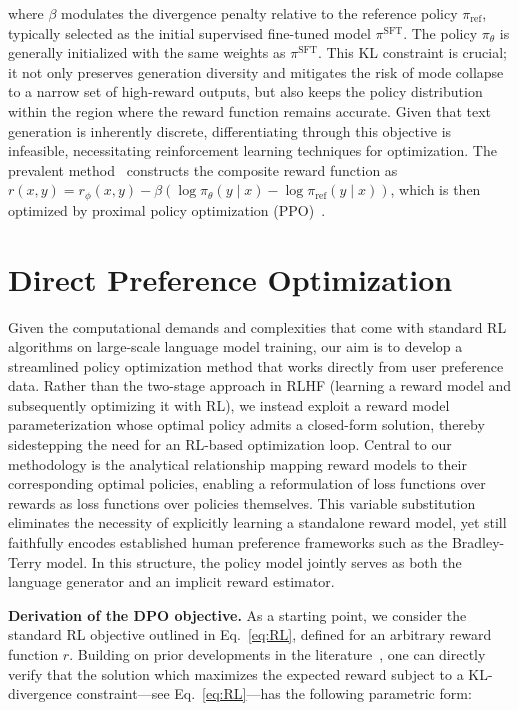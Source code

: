 where $\beta$ modulates the divergence penalty relative to the reference policy $\pi_\text{ref}$, typically selected as the initial supervised fine-tuned model $\pi^\text{SFT}$. The policy $\pi_\theta$ is generally initialized with the same weights as $\pi^\text{SFT}$. This KL constraint is crucial; it not only preserves generation diversity and mitigates the risk of mode collapse to a narrow set of high-reward outputs, but also keeps the policy distribution within the region where the reward function remains accurate. Given that text generation is inherently discrete, differentiating through this objective is infeasible, necessitating reinforcement learning techniques for optimization. The prevalent method~\citep{ziegler2020finetuning, stiennon2022learning, bai2022training, ouyang2022training} constructs the composite reward function as ${r(x, y) = r_{\phi}(x, y) -\beta (\log \pi_{\theta}(y\mid x) - \log \pi_\text{ref}(y\mid x))}$, which is then optimized by proximal policy optimization (PPO)~\cite{schulman2017proximal}. 

\section{Direct Preference Optimization}\label{sec:DPO}

Given the computational demands and complexities that come with standard RL algorithms on large-scale language model training, our aim is to develop a streamlined policy optimization method that works directly from user preference data. Rather than the two-stage approach in RLHF (learning a reward model and subsequently optimizing it with RL), we instead exploit a reward model parameterization whose optimal policy admits a closed-form solution, thereby sidestepping the need for an RL-based optimization loop. Central to our methodology is the analytical relationship mapping reward models to their corresponding optimal policies, enabling a reformulation of loss functions over rewards as loss functions over policies themselves. This variable substitution eliminates the necessity of explicitly learning a standalone reward model, yet still faithfully encodes established human preference frameworks such as the Bradley-Terry model. In this structure, the policy model jointly serves as both the language generator and an implicit reward estimator.

\textbf{Derivation of the DPO objective.} As a starting point, we consider the standard RL objective outlined in Eq.~\ref{eq:RL}, defined for an arbitrary reward function $r$. Building on prior developments in the literature~\citep{peters2007reinforcement, peng2019advantage, korbak2022reinforcement, go2023aligning}, one can directly verify that the solution which maximizes the expected reward subject to a KL-divergence constraint—see Eq.~\ref{eq:RL}—has the following parametric form:


